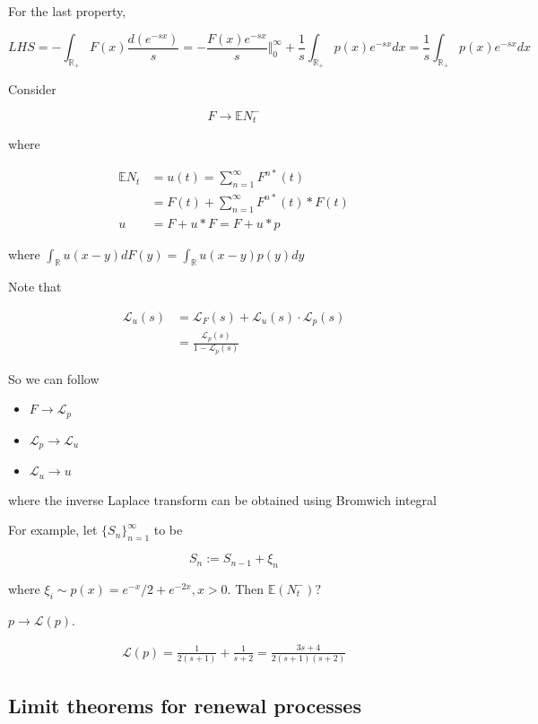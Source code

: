 \documentclass[12pt]{article}
\theoremstyle{nonumberbreak}
\begin{document}
For the last property,

$$
LHS = -\int_{\mathbb{R}_+} F(x) \frac{d(e^{-sx})}{s} = - \frac{F(x)e^{-sx}}{s} \Vert_0^\infty + \frac{1}{s} \int_{\mathbb{R}_+}p(x) e^{-sx}dx = \frac{1}{s} \int_{\mathbb{R}_+}p(x) e^{-sx}dx
$$


Consider

$$
F \to \mathbb{E} N_t^{-}
$$

where 

$$
\begin{aligned}
\mathbb{E} N_t &= u(t) = \sum_{n=1}^\infty F^{n\ast} (t) \\[8pt]
&= F(t) + \sum_{n=1}^\infty F^{n\ast} (t) \ast F(t) \\[10pt]
u&= F + u \ast F = F + u \ast p
\end{aligned}
$$

where $\int_\mathbb{R} u(x-y) dF(y) = \int_\mathbb{R} u(x-y) p(y) dy$


Note that 

$$
\begin{aligned}
\mathcal{L}_u (s) &= \mathcal{L}_F (s) + \mathcal{L}_u (s) \cdot \mathcal{L}_p (s) \\[8pt]
&= \frac{\mathcal{L}_p(s)}{1-\mathcal{L}_p(s)}
\end{aligned}
$$


So we can follow 

\begin{itemize}
	\item $F \to \mathcal{L}_p$
	\item $\mathcal{L}_p \to \mathcal{L}_u$
	\item $\mathcal{L}_u \to u$
\end{itemize}

where the inverse Laplace transform can be obtained using Bromwich integral



For example, let $\{S_n \}_{n=1}^\infty$ to be

$$
S_n := S_{n-1} + \xi_n
$$

where $\xi_i \sim p(x) = e^{-x}/2 + e^{-2x}, x>0$. Then $\mathbb{E} (N_t^{-})?$


\textbf{$p \to \mathcal{L}(p)$}. 

$$
\begin{aligned}
\mathcal{L}(p) = \frac{1}{2(s+1)} + \frac{1}{s+2} = \frac{3s + 4}{2(s+1)(s+2)}  
\end{aligned}
$$


\subsection{Limit theorems for renewal processes}
\end{document}
